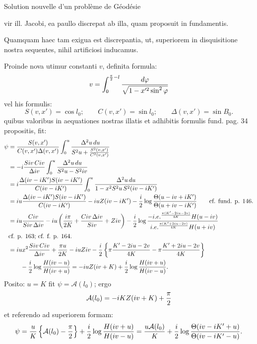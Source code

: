 \begingroup\small
\begin{center}
Solution nouvelle d'un problème de Géodésie
\end{center}
vir ill. Jacobi, ea paullo discrepat ab illa, quam proposuit in fundamentis.

Quamquam haec tam exigua est discrepantia, ut, superiorem in disquisitione nostra sequentes, nihil artificiosi inducamus.

Proinde nova utimur constanti $v$, definita formula:
\[
 v=\int_0^{\frac{\pi}{2}-l}{d\varphi\over \sqrt{1-x'^2\sin^2\varphi}}
\]
vel his formulis:
\[
 S(v,x')=\cos l_0;\qquad C(v,x')=\sin l_0;\qquad \Delta(v,x')=\sin B_0.
\]
quibus valoribus in aequationes nostras illatis et adhibitis formulis fund. pag. 34 propositis, fit:
{\small
\[
\begin{aligned}
\psi&={S(v,x')\over C(v,x')\Delta(v,x')}
  \int_0^u {\Delta^2u\,du\over S^2u+{S^2(v,x')\over C^2(v,x')}}\\
&=-i{Siv\,Civ\over \Delta iv}\int_0^u{\Delta^2u\,du\over S^2u-S^2iv}\\
&=i{\Delta(iv-iK')S(iv-iK')\over C(iv-iK')}
  \int_0^u {\Delta^2u\,du\over 1-x^2S^2u\,S^2(iv-iK')}\\
&=iu{\Delta(iv-iK')S(iv-iK')\over C(iv-iK')}
  -iuZ(iv-iK')-{i\over2}\log{\Theta(u-iv+iK')\over\Theta(u+iv-iK')}\qquad \text{cf. fund. p. 146.}\\
&=iu{Civ\over Siv\,\Delta iv}-iu\left({i\pi\over2K}+{Civ\,\Delta iv\over Siv}+Ziv\right)
 -{i\over2}\log{-i.e.^{{\pi(K'-2iu-2v)\over4K}}H(u-iv)\over i.e.^{{\pi(K'+2iu-2v)\over4K}}H(u+iv)}\\
&\hfill \text{cf. p. 163; cf. f. p. 164.}\\
&=iux^2{Siv\,Civ\over\Delta iv}+{\pi u\over2K}-iuZiv
 -{i\over2}\left\{\pi{K'-2iu-2v\over4K}-\pi{K'+2iu-2v\over4K}\right\}\\
&\qquad{}-{i\over2}\log{H(iv-u)\over H(iv+u)}
=-iuZ(iv+K)+{i\over2}\log{H(iv+u)\over H(iv-u)}.
\end{aligned}
\]
}
Posito: $u=K$ fit $\psi=\mathcal A(l_0)$; ergo
\[
 \mathcal A(l_0)=-iKZ(iv+K)+{\pi\over2}
\]
et referendo ad superiorem formam:
\[
 \psi={u\over K}\left\{\mathcal A(l_0)-{\pi\over2}\right\}
 +{i\over2}\log{H(iv+u)\over H(iv-u)}
 ={u\mathcal A(l_0)\over K}+{i\over2}\log{\Theta(iv-iK'+u)\over \Theta(iv-iK'-u)}.
\]
\endgroup
